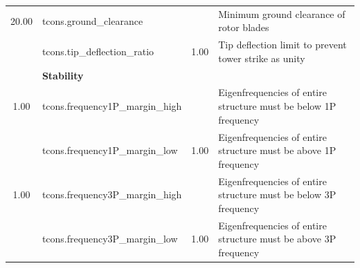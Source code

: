 \begin{table}[htbp]
\begin{center}
{\begin{tabular}{ c l c l}
  20.00 & tcons.ground\_clearance &  & Minimum ground clearance of rotor blades\\
 & tcons.tip\_deflection\_ratio & 1.00 & Tip deflection limit to prevent tower strike as unity\\
 & \textbf{Stability} &  & \\
  1.00 & tcons.frequency1P\_margin\_high &  & Eigenfrequencies of entire structure must be below 1P frequency\\
 & tcons.frequency1P\_margin\_low & 1.00 & Eigenfrequencies of entire structure must be above 1P frequency\\
  1.00 & tcons.frequency3P\_margin\_high &  & Eigenfrequencies of entire structure must be below 3P frequency\\
 & tcons.frequency3P\_margin\_low & 1.00 & Eigenfrequencies of entire structure must be above 3P frequency\\
    \hline \end{tabular}
  }
\end{center} \end{table}
